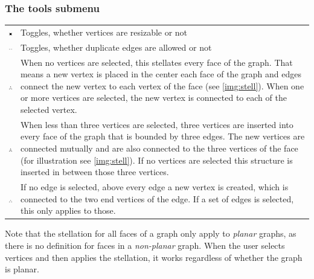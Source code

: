 \subsubsection{The tools submenu}
\label{toolsSub}
\begin{tabular}{p{}p{}}
\includegraphics[scale=0.6]{figures/icons/resize_nodes.png}& Toggles, whether vertices are resizable or not\\
\includegraphics[scale=0.6]{figures/icons/doubleEdges.png}& Toggles, whether duplicate edges are allowed or not\\
\includegraphics[scale=0.6]{figures/icons/stellation.png}& When no vertices are selected, this stellates every face of the graph. That means a new vertex is placed in the center each face of the graph and edges connect the new vertex to each vertex of the face (see \autoref{img:stell}). When one or more vertices are selected, the new vertex is connected to each of the selected vertex.\\
\includegraphics[scale=0.6]{figures/icons/three_stellation.png}& When less than three vertices are selected, three vertices are inserted into every face of the graph that is bounded by three edges. The new vertices are connected mutually and are also connected to the three vertices of the face (for illustration see \autoref{img:stell}). If no vertices are selected this structure is inserted in between those three vertices.\\
\includegraphics[scale=0.6]{figures/icons/edgeStellation.png}& If no edge is selected, above every edge a new vertex is created, which is connected to the two end vertices of the edge. If a set of edges is selected, this only applies to those.\\
\end{tabular}
Note that the stellation for all faces of a graph only apply to \textit{planar} graphs, as there is no definition for faces in a \textit{non-planar} graph. When the user selects vertices and then applies the stellation, it works regardless of whether the graph is planar.
